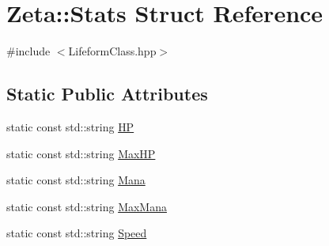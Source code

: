 \hypertarget{structZeta_1_1Stats}{\section{Zeta\+:\+:Stats Struct Reference}
\label{structZeta_1_1Stats}
}


{\ttfamily \#include $<$Lifeform\+Class.\+hpp$>$}

\subsection*{Static Public Attributes}
\begin{DoxyCompactItemize}
\item 
static const std\+::string \hyperlink{structZeta_1_1Stats_aa5922fb31d2790f7779ad2e7e4d464ce}{H\+P}
\item 
static const std\+::string \hyperlink{structZeta_1_1Stats_aee195a6f113d82bd5e561fcc69abb44c}{Max\+H\+P}
\item 
static const std\+::string \hyperlink{structZeta_1_1Stats_a66d2fd47b970cc2381f931f7752d8812}{Mana}
\item 
static const std\+::string \hyperlink{structZeta_1_1Stats_a4353689bc3919919c8052d834810813f}{Max\+Mana}
\item 
static const std\+::string \hyperlink{structZeta_1_1Stats_af09b51db0fc0d7f5c223d4691a5f40fd}{Speed}
\end{DoxyCompactItemize}


